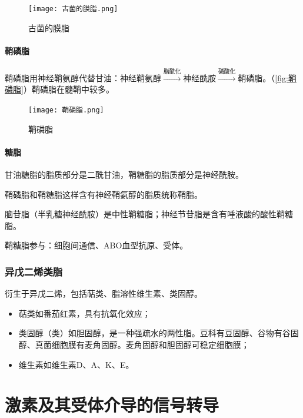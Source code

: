 \begin{figure}[htbp]
	\centering
	\texttt{[image: 古菌的膜脂.png]}
	\caption{古菌的膜脂}
	\label{fig:古菌的膜脂}
\end{figure}

\paragraph{鞘磷脂}

鞘磷脂用神经鞘氨醇代替甘油：神经鞘氨醇$\xrightarrow{\text{脂酰化}}$神经酰胺$\xrightarrow{\text{磷酸化}}$鞘磷脂。（\autoref{fig:鞘磷脂}）鞘磷脂在髓鞘中较多。

\begin{figure}[htbp]
	\centering
	\texttt{[image: 鞘磷脂.png]}
	\caption{鞘磷脂}
	\label{fig:鞘磷脂}
\end{figure}

\paragraph{糖脂}

甘油糖脂的脂质部分是二酰甘油，鞘糖脂的脂质部分是神经酰胺。

鞘磷脂和鞘糖脂这样含有神经鞘氨醇的脂质统称鞘脂。

脑苷脂（半乳糖神经酰胺）是中性鞘糖脂；神经节苷脂是含有唾液酸的酸性鞘糖脂。

鞘糖脂参与：细胞间通信、ABO血型抗原、受体。

\subsubsection{异戊二烯类脂}

衍生于异戊二烯，包括萜类、脂溶性维生素、类固醇。

\begin{itemize}
	\item 萜类如番茄红素，具有抗氧化效应；
	\item 类固醇（类）如胆固醇，是一种强疏水的两性脂。豆科有豆固醇、谷物有谷固醇、真菌细胞膜有麦角固醇。麦角固醇和胆固醇可稳定细胞膜；
	\item 维生素如维生素D、A、K、E。
\end{itemize}


\section[激素和信号转导]{激素及其受体介导的信号转导}

